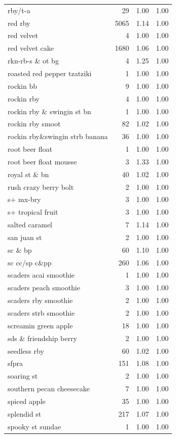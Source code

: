 \begin{table}
\begin{tabular}{lrrr}
rby/t-a & 29 & 1.00 & 1.00 \\
red rby & 5065 & 1.14 & 1.00 \\
red velvet & 4 & 1.00 & 1.00 \\
red velvet cake & 1680 & 1.06 & 1.00 \\
rkn-rb-s \& ot bg & 4 & 1.25 & 1.00 \\
roasted red pepper tzatziki & 1 & 1.00 & 1.00 \\
rockin bb & 9 & 1.00 & 1.00 \\
rockin rby & 4 & 1.00 & 1.00 \\
rockin rby \& swingin st bn & 1 & 1.00 & 1.00 \\
rockin rby smoot & 82 & 1.02 & 1.00 \\
rockin rby\&swingin strb banana & 36 & 1.00 & 1.00 \\
root beer float & 1 & 1.00 & 1.00 \\
root beer float mousse & 3 & 1.33 & 1.00 \\
royal st \& bn & 40 & 1.02 & 1.00 \\
rush crazy berry bolt & 2 & 1.00 & 1.00 \\
s+ mx-bry & 3 & 1.00 & 1.00 \\
s+ tropical fruit & 3 & 1.00 & 1.00 \\
salted caramel & 7 & 1.14 & 1.00 \\
san juan st & 2 & 1.00 & 1.00 \\
sc \& bp & 60 & 1.10 & 1.00 \\
sc cc/sp c\&pp & 260 & 1.06 & 1.00 \\
scaders acai smoothie & 1 & 1.00 & 1.00 \\
scaders peach smoothie & 3 & 1.00 & 1.00 \\
scaders rby smoothie & 2 & 1.00 & 1.00 \\
scaders strb smoothie & 2 & 1.00 & 1.00 \\
screamin green apple & 18 & 1.00 & 1.00 \\
sds \& friendship berry & 2 & 1.00 & 1.00 \\
seedless rby & 60 & 1.02 & 1.00 \\
sfpra & 151 & 1.08 & 1.00 \\
soaring st & 2 & 1.00 & 1.00 \\
southern pecan cheesecake & 7 & 1.00 & 1.00 \\
spiced apple & 35 & 1.00 & 1.00 \\
splendid st & 217 & 1.07 & 1.00 \\
spooky st sundae & 1 & 1.00 & 1.00 \\

\end{tabular}
\end{table}
